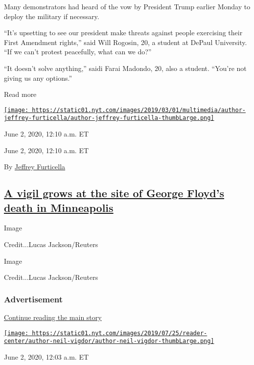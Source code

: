 Many demonstrators had heard of the vow by President Trump earlier
Monday to deploy the military if necessary.

``It's upsetting to see our president make threats against people
exercising their First Amendment rights,'' said Will Rogosin, 20, a
student at DePaul University. ``If we can't protest peacefully, what can
we do?''

``It doesn't solve anything,'' saidi Farai Madondo, 20, also a student.
``You're not giving us any options.''

Read more

\href{https://www.nytimes.com/by/jeffrey-furticella}{\texttt{[image: https://static01.nyt.com/images/2019/03/01/multimedia/author-jeffrey-furticella/author-jeffrey-furticella-thumbLarge.png]}}

June 2, 2020, 12:10 a.m. ET

June 2, 2020, 12:10 a.m. ET

By \href{https://www.nytimes.com/by/jeffrey-furticella}{Jeffrey
Furticella}

\hypertarget{a-vigil-grows-at-the-site-of-george-floyds-death-in-minneapolis}{%
\subsection{\texorpdfstring{\protect\hyperlink{a-vigil-grows-at-the-site-of-george-floyds-death-in-minneapolis}{A
vigil grows at the site of George Floyd's death in
Minneapolis}}{A vigil grows at the site of George Floyd's death in Minneapolis}}\label{a-vigil-grows-at-the-site-of-george-floyds-death-in-minneapolis}}

Image

Credit...Lucas Jackson/Reuters

Image

Credit...Lucas Jackson/Reuters

\hypertarget{advertisement-1}{%
\subsubsection{Advertisement}\label{advertisement-1}}

\protect\hyperlink{after-dfp-ad-mid2}{Continue reading the main story}

\href{https://www.nytimes.com/by/neil-vigdor}{\texttt{[image: https://static01.nyt.com/images/2019/07/25/reader-center/author-neil-vigdor/author-neil-vigdor-thumbLarge.png]}}

June 2, 2020, 12:03 a.m. ET

